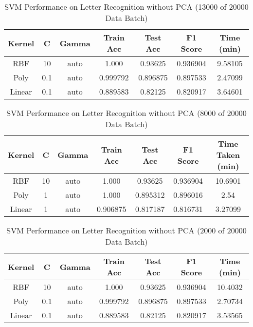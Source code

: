 \documentclass[conference]{IEEEtran}
\begin{document}
\begin{table}[H]
\centering
\caption{SVM Performance on Letter Recognition without PCA (13000 of 20000 Data Batch)}

\begin{tabular}{|c|c|c|c|c|c|c|}
\hline
Kernel & C & Gamma & Train Acc & Test Acc & F1 Score & Time (min) \\ \hline
RBF & 10 & auto & 1.000 & 0.93625 & 0.936904 & 9.58105 \\ \hline
Poly & 0.1 & auto & 0.999792 & 0.896875 & 0.897533 & 2.47099 \\ \hline
Linear & 0.1 & auto & 0.889583 & 0.82125 & 0.820917 & 3.64601 \\ \hline

\end{tabular}
\end{table}


\begin{table}[H]
\centering
\caption{SVM Performance on Letter Recognition without PCA (8000 of 20000 Data Batch)}
\begin{tabular}{|c|c|c|c|c|c|c|}
\hline
Kernel & C & Gamma & Train Acc & Test Acc & F1 Score & Time Taken (min) \\ \hline
RBF & 10 & auto & 1.000 & 0.93625 & 0.936904 & 10.6901 \\ \hline
Poly & 1 & auto & 1.000 & 0.895312 & 0.896016 & 2.54 \\ \hline
Linear & 1 & auto & 0.906875	 & 0.817187 & 0.816731 & 3.27099 \\ \hline
\end{tabular}
\end{table}

\newpage

\begin{table}[H]
\centering
\caption{SVM Performance on Letter Recognition without PCA (2000 of 20000 Data Batch)}

\begin{tabular}{|c|c|c|c|c|c|c|}
\hline
Kernel & C & Gamma & Train Acc & Test Acc & F1 Score & Time (min) \\ \hline
RBF & 10 & auto & 1.000 & 0.93625 & 0.936904 & 10.4032 \\ \hline
Poly & 0.1 & auto & 0.999792 & 0.896875 & 0.897533 & 2.70734 \\ \hline
Linear & 0.1 & auto & 0.889583 & 0.82125 & 0.820917 & 3.53565 \\ \hline

\end{tabular}
\end{table}
\end{document}
